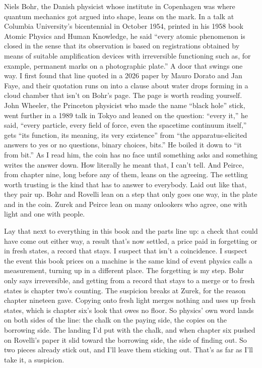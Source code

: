 \documentclass[11pt,twoside]{article}
\theoremstyle{thielethm}
\theoremstyle{thieledef}
\theoremstyle{thieledef}
\theoremstyle{thieledef}
\theoremstyle{thielethm}
\theoremstyle{thieleobs}
\theoremstyle{thielethm}
\begin{document}
Niels Bohr, the Danish physicist whose institute in Copenhagen was where quantum mechanics got argued into shape, leans on the mark. In a talk at Columbia University's bicentennial in October 1954, printed in his 1958 book Atomic Physics and Human Knowledge, he said ``every atomic phenomenon is closed in the sense that its observation is based on registrations obtained by means of suitable amplification devices with irreversible functioning such as, for example, permanent marks on a photographic plate.'' A door that swings one way. I first found that line quoted in a 2026 paper by Mauro Dorato and Jan Faye, and their quotation runs on into a clause about water drops forming in a cloud chamber that isn't on Bohr's page. The page is worth reading yourself. John Wheeler, the Princeton physicist who made the name ``black hole'' stick, went further in a 1989 talk in Tokyo and leaned on the question: ``every it,'' he said, ``every particle, every field of force, even the spacetime continuum itself,'' gets ``its function, its meaning, its very existence'' from ``the apparatus-elicited answers to yes or no questions, binary choices, bits.'' He boiled it down to ``it from bit.'' As I read him, the coin has no face until something asks and something writes the answer down. How literally he meant that, I can't tell. And Peirce, from chapter nine, long before any of them, leans on the agreeing. The settling worth trusting is the kind that has to answer to everybody. Laid out like that, they pair up. Bohr and Rovelli lean on a step that only goes one way, in the plate and in the coin. Zurek and Peirce lean on many onlookers who agree, one with light and one with people.

Lay that next to everything in this book and the parts line up: a check that could have come out either way, a result that's now settled, a price paid in forgetting or in fresh states, a record that stays. I suspect that isn't a coincidence. I suspect the event this book prices on a machine is the same kind of event physics calls a measurement, turning up in a different place. The forgetting is my step. Bohr only says irreversible, and getting from a record that stays to a merge or to fresh states is chapter two's counting. The suspicion breaks at Zurek, for the reason chapter nineteen gave. Copying onto fresh light merges nothing and uses up fresh states, which is chapter six's look that owes no floor. So physics' own word lands on both sides of the line: the chalk on the paying side, the copies on the borrowing side. The landing I'd put with the chalk, and when chapter six pushed on Rovelli's paper it slid toward the borrowing side, the side of finding out. So two pieces already stick out, and I'll leave them sticking out. That's as far as I'll take it, a suspicion.
\end{document}
